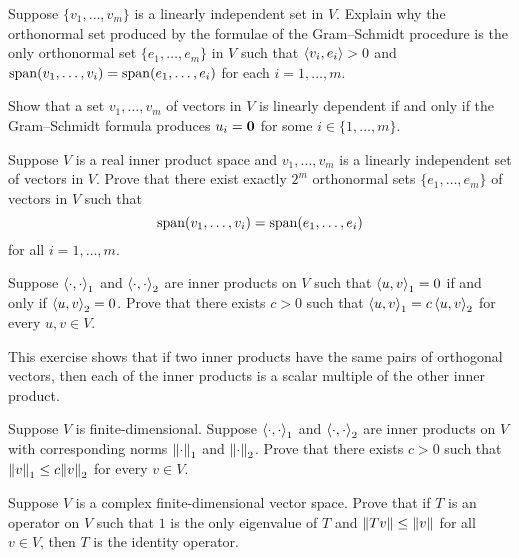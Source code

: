 \begin{exercise}
Suppose $\{v_1,\dots,v_m\}$ is a linearly independent set in $V$. Explain why the orthonormal set produced by the formulae of the Gram--Schmidt procedure is the only orthonormal set $\{e_1,\dots,e_m\}$ in $V$ such that $\left\langle v_i,e_i\right\rangle>0$ and $\operatorname{span}(v_1,\dots,v_i)=\operatorname{span}(e_1,\dots,e_i)$ for each $i=1,\dots,m$.
\end{exercise}

\begin{exercise}
Show that a set $v_1,\dots,v_m$ of vectors in $V$ is linearly dependent if and only if the Gram--Schmidt formula produces $u_i=\vb{0}$ for some $i\in\{1,\dots,m\}$.
\end{exercise}

\begin{exercise}
Suppose $V$ is a real inner product space and $v_1,\dots,v_m$ is a linearly independent set of vectors in $V$. Prove that there exist exactly $2^m$ orthonormal sets $\{e_1,\dots,e_m\}$ of vectors in $V$ such that
\[\operatorname{span}(v_1,\dots,v_i)=\operatorname{span}(e_1,\dots,e_i)\]
for all $i=1,\dots,m$.
\end{exercise}

\begin{exercise}
Suppose $\left\langle\cdot,\cdot\right\rangle_1$ and $\left\langle\cdot,\cdot\right\rangle_2$ are inner products on $V$ such that $\left\langle u,v\right\rangle_1=0$ if and only if $\left\langle u,v\right\rangle_2=0$. Prove that there exists $c>0$ such that $\left\langle u,v\right\rangle_1=c\left\langle u,v\right\rangle_2$ for every $u,v\in V$.
\end{exercise}

This exercise shows that if two inner products have the same pairs of orthogonal vectors, then each of the inner products is a scalar multiple of the other inner product.

\begin{exercise}
Suppose $V$ is finite-dimensional. Suppose $\left\langle\cdot,\cdot\right\rangle_1$ and $\left\langle\cdot,\cdot\right\rangle_2$ are inner products on $V$ with corresponding norms $\norm{\cdot}_1$ and $\norm{\cdot}_2$. 
Prove that there exists $c>0$ such that $\norm{v}_1\le c\norm{v}_2$ for every $v\in V$.
\end{exercise}

\begin{exercise}
Suppose $V$ is a complex finite-dimensional vector space. Prove that if $T$ is an operator on $V$ such that $1$ is the only eigenvalue of $T$ and $\norm{Tv}\le\norm{v}$ for all $v\in V$, then $T$ is the identity operator.
\end{exercise}

